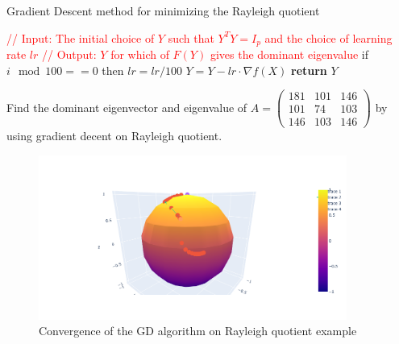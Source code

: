 \documentclass[11pt,a4paper]{report}
\begin{document}
\begin{algorithm}
\caption{Gradient Descent method for minimizing the Rayleigh quotient}
    \begin{algorithmic}[1]
        \State \textcolor{red}{// Input: The initial choice of $Y$ such that $Y^T Y = I_p$ and the choice of learning rate $lr$}
        \State \textcolor{red}{// Output: $Y$ for which of $F(Y)$ gives the dominant eigenvalue}
        \State if $i \mod 100 == 0$ then $lr = lr/100$ 
        \State $Y = Y - lr \cdot  \nabla f (X)$
        \EndFor
        \State \textbf{return} $Y$
        \EndProcedure
    \end{algorithmic}
\end{algorithm}
\begin{Ex}
    Find the dominant eigenvector and eigenvalue of $A = \begin{pmatrix} 181 & 101 & 146 \\ 101 & 74 & 103 \\ 146 & 103 & 146 \end{pmatrix} $ 
    by using gradient decent on Rayleigh quotient.
\end{Ex}
\begin{figure}[h] \label{gradRay}
    \centering
    \includegraphics[width=0.90\textwidth]{gradientDescent1.png}
    \caption{Convergence of the GD algorithm on Rayleigh quotient example}
\end{figure}
\newpage
\end{document}
